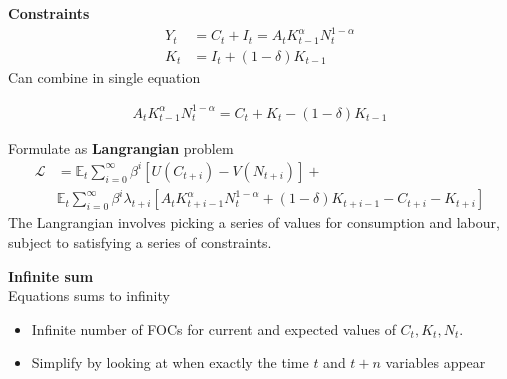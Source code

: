 \documentclass{beamer}
\begin{document}
\begin{frame}
  \textbf{Constraints}  
\begin{align}
  Y_t &= C_t + I_t = A_tK^\alpha_{t-1}N^{1-\alpha}_t\\ \nonumber
  K_t &= I_t + (1-\delta)K_{t-1}
\end{align}
 Can combine in single equation

\begin{align}
  A_tK^\alpha_{t-1}N^{1-\alpha}_t=C_t + K_t - (1-\delta)K_{t-1}
\end{align}
\end{frame}

\begin{frame}
Formulate as  \textbf{Langrangian} problem 
\begin{align}
  \mathcal{L} &= \mathbb{E}_t \sum^{\infty}_{i=0}\beta^i[U(C_{t+i}) - V(N_{t+i})] +\\ \nonumber
  & \mathbb{E}_t \sum^{\infty}_{i=0}\beta^i \lambda_{t+i} [A_tK^\alpha_{t+i-1}N^{1-\alpha}_t + (1-\delta)K_{t+i-1} - C_{t+i} - K_{t+i}]
\end{align}
 The Langrangian involves picking a series of values for consumption and labour, subject to satisfying a series of constraints. 
\end{frame}

\begin{frame}
  \textbf{Infinite sum}\\
  Equations sums to infinity
  \begin{itemize}
    \item Infinite number of FOCs for current and expected values of $C_t, K_t,N_t$.
    \item Simplify by looking at when exactly the time $t$ and $t+n$ variables appear
  \end{itemize}  
\end{frame}
\end{document}
